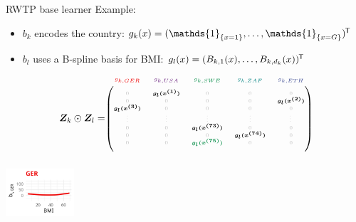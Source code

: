 \documentclass[t,10pt]{beamer}
\begin{document}
\begin{frame}{RWTP base learner}
  Example:
  \begin{itemize}
    \item $b_k$ encodes the country: $g_k(x) = (\mathds{1}_{\{x = 1\}}, \dots, \mathds{1}_{\{x = G\}})^\tran$
    \item $b_l$ uses a B-spline basis for BMI: $g_l(x) = (B_{k,1}(x), \dots, B_{k,d_k}(x))^{\mkern-1.5mu\mathsf{T}}$
  \end{itemize}
  $$
    \design_k \odot \design_l = \tiny\begin{blockarray}{ccccc}
      \color[HTML]{EE0000}g_{k,GER} & \color[HTML]{631879}g_{k,USA} & \color[HTML]{008B45}g_{k,SWE} & \color[HTML]{008280}g_{k,ZAF} & \color[HTML]{3B4992}g_{k,ETH}\\
    \begin{block}{(ccccc)}
      \phantom{x}\\
      \color{lightgray}0 & \color{black}\bm{g_l(x^{(1)})} & \color{lightgray}0 & \color{lightgray}0 & \color{lightgray}0 \\
      \color{lightgray}0 & \color{lightgray}0 & \color{lightgray}0 & \color{lightgray}0 & \color{black}\bm{g_l(x^{(2)})} \\
      \color{black}\bm{g_l(x^{(3)})} & \color{lightgray}0 & \color{lightgray}0 & \color{lightgray}0 & \color{lightgray}0 \\
      \color{lightgray}\vdots & \color{lightgray}\vdots & \color{lightgray}\vdots & \color{lightgray}\vdots & \color{lightgray}\vdots \\
      \color{lightgray}0 & \color{lightgray}0 & \color{black}\bm{g_l(x^{(73)})} & \color{lightgray}0 & \color{lightgray}0 \\
      \color{lightgray}0 & \color{lightgray}0 & \color{lightgray}0 & \color{black}\bm{g_l(x^{(74)})} & \color{lightgray}0 \\
      \color{lightgray}0 & \color{lightgray}0 & \color[HTML]{008B45}\bm{g_l(x^{(75)})} & \color{lightgray}0 & \color{lightgray}0 \\
      \phantom{x}\\
    \end{block}
  \end{blockarray}
  $$
  \normalsize
  {\includegraphics[width=0.19\textwidth]{figures/bs-tensor/fig-tensor-GER.png}}

\end{frame}
\end{document}
